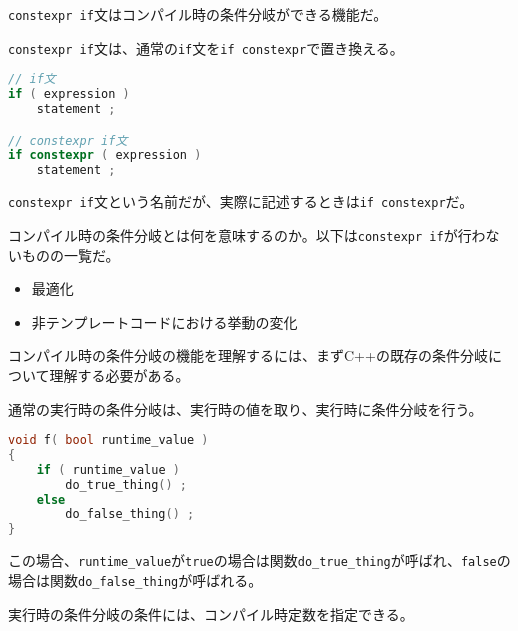 %

\lstinline!constexpr if!文はコンパイル時の条件分岐ができる機能だ。

\lstinline!constexpr if!文は、通常の\lstinline!if!文を\lstinline!if constexpr!で置き換える。

\begin{lstlisting}[language=C++]
// if文
if ( expression )
    statement ;

// constexpr if文
if constexpr ( expression )
    statement ;
\end{lstlisting}

\lstinline!constexpr if!文という名前だが、実際に記述するときは\lstinline!if constexpr!だ。

コンパイル時の条件分岐とは何を意味するのか。以下は\lstinline!constexpr if!が\textsf{行わないもの}の一覧だ。

\begin{itemize}
\itemsep1pt\parskip0pt
\item
  最適化
\item
  非テンプレートコードにおける挙動の変化
\end{itemize}

コンパイル時の条件分岐の機能を理解するには、まずC++の既存の条件分岐について理解する必要がある。

%

通常の実行時の条件分岐は、実行時の値を取り、実行時に条件分岐を行う。

\begin{lstlisting}[language=C++]
void f( bool runtime_value )
{
    if ( runtime_value )
        do_true_thing() ;
    else
        do_false_thing() ;
}
\end{lstlisting}

この場合、\lstinline!runtime_value!が\lstinline!true!の場合は関数\lstinline!do_true_thing!が呼ばれ、\lstinline!false!の場合は関数\lstinline!do_false_thing!が呼ばれる。

実行時の条件分岐の条件には、コンパイル時定数を指定できる。

